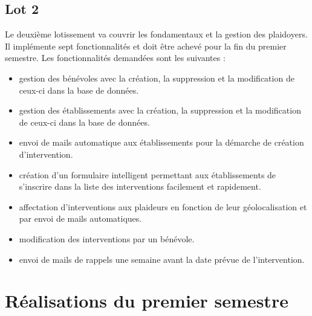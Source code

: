 \documentclass[asi]{picInsa}
\begin{document}
\subsection{Lot 2}
Le deuxième lotissement va couvrir les fondamentaux et la gestion des plaidoyers. Il implémente sept fonctionnalités et doit être achevé pour la fin du premier semestre. Les fonctionnalités demandées sont les suivantes :
\begin{itemize}
	\item gestion des bénévoles avec la création, la suppression et la modification de ceux-ci dans la base de données.
	\item gestion des établissements avec la création, la suppression et la modification de ceux-ci dans la base de données.
	\item envoi de mails automatique aux établissements pour la démarche de création d'intervention.
	\item création d'un formulaire intelligent permettant aux établissements de s'inscrire dans la liste des interventions facilement et rapidement.
	\item affectation d'interventions aux plaideurs en fonction de leur géolocalisation et par envoi de mails automatiques.
	\item modification des interventions par un bénévole.
	\item envoi de mails de rappels une semaine avant la date prévue de l'intervention.
\end{itemize}



\section{Réalisations du premier semestre}
\end{document}
